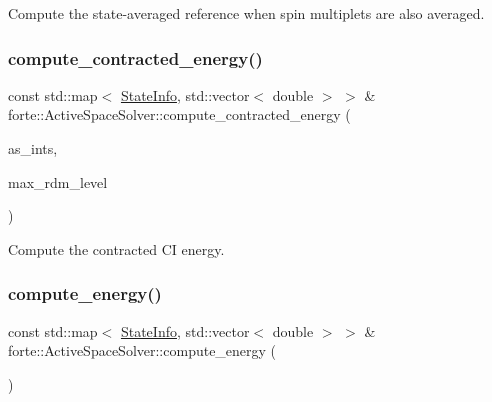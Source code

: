 Compute the state-\/averaged reference when spin multiplets are also averaged. 

\mbox{\label{classforte_1_1_active_space_solver_a53ed58e64499f8fa661b49d48648f3cb}} 
\subsubsection{\texorpdfstring{compute\+\_\+contracted\+\_\+energy()}{compute\_contracted\_energy()}}
{\footnotesize\ttfamily const std\+::map$<$ \mbox{\hyperlink{classforte_1_1_state_info}{State\+Info}}, std\+::vector$<$ double $>$ $>$ \& forte\+::\+Active\+Space\+Solver\+::compute\+\_\+contracted\+\_\+energy (\begin{DoxyParamCaption}\item[{std\+::shared\+\_\+ptr$<$ \mbox{\hyperlink{classforte_1_1_active_space_integrals}{forte\+::\+Active\+Space\+Integrals}} $>$}]{as\+\_\+ints,  }\item[{int}]{max\+\_\+rdm\+\_\+level }\end{DoxyParamCaption})}



Compute the contracted CI energy. 

\mbox{\label{classforte_1_1_active_space_solver_a719be2ea9e2d227fd810481f7dd644a1}} 
\subsubsection{\texorpdfstring{compute\+\_\+energy()}{compute\_energy()}}
{\footnotesize\ttfamily const std\+::map$<$ \mbox{\hyperlink{classforte_1_1_state_info}{State\+Info}}, std\+::vector$<$ double $>$ $>$ \& forte\+::\+Active\+Space\+Solver\+::compute\+\_\+energy (\begin{DoxyParamCaption}{ }\end{DoxyParamCaption})}



